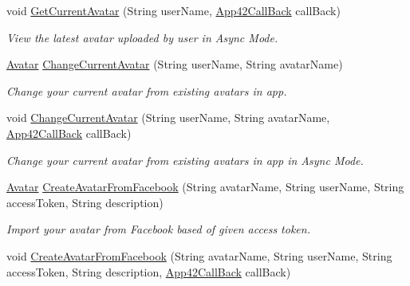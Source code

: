 \begin{DoxyCompactItemize}
void \hyperlink{classcom_1_1shephertz_1_1app42_1_1paas_1_1sdk_1_1csharp_1_1avatar_1_1_avatar_service_a6856f001c444ed300d6c927d7168856b}{Get\+Current\+Avatar} (String user\+Name, \hyperlink{interfacecom_1_1shephertz_1_1app42_1_1paas_1_1sdk_1_1csharp_1_1_app42_call_back}{App42\+Call\+Back} call\+Back)
\begin{DoxyCompactList}\small\item\em View the latest avatar uploaded by user in Async Mode. \end{DoxyCompactList}\item 
\hyperlink{classcom_1_1shephertz_1_1app42_1_1paas_1_1sdk_1_1csharp_1_1avatar_1_1_avatar}{Avatar} \hyperlink{classcom_1_1shephertz_1_1app42_1_1paas_1_1sdk_1_1csharp_1_1avatar_1_1_avatar_service_ae79a7986c8dee949daa72bde1900f4ab}{Change\+Current\+Avatar} (String user\+Name, String avatar\+Name)
\begin{DoxyCompactList}\small\item\em Change your current avatar from existing avatars in app. \end{DoxyCompactList}\item 
void \hyperlink{classcom_1_1shephertz_1_1app42_1_1paas_1_1sdk_1_1csharp_1_1avatar_1_1_avatar_service_ae85cfae1c508eead9a17cc459cd271a9}{Change\+Current\+Avatar} (String user\+Name, String avatar\+Name, \hyperlink{interfacecom_1_1shephertz_1_1app42_1_1paas_1_1sdk_1_1csharp_1_1_app42_call_back}{App42\+Call\+Back} call\+Back)
\begin{DoxyCompactList}\small\item\em Change your current avatar from existing avatars in app in Async Mode. \end{DoxyCompactList}\item 
\hyperlink{classcom_1_1shephertz_1_1app42_1_1paas_1_1sdk_1_1csharp_1_1avatar_1_1_avatar}{Avatar} \hyperlink{classcom_1_1shephertz_1_1app42_1_1paas_1_1sdk_1_1csharp_1_1avatar_1_1_avatar_service_ac03e5b6f2024010a8b6a1dceb283c28c}{Create\+Avatar\+From\+Facebook} (String avatar\+Name, String user\+Name, String access\+Token, String description)
\begin{DoxyCompactList}\small\item\em Import your avatar from Facebook based of given access token. \end{DoxyCompactList}\item 
void \hyperlink{classcom_1_1shephertz_1_1app42_1_1paas_1_1sdk_1_1csharp_1_1avatar_1_1_avatar_service_aa458a6c81f7395dac620a0c7c123ca3d}{Create\+Avatar\+From\+Facebook} (String avatar\+Name, String user\+Name, String access\+Token, String description, \hyperlink{interfacecom_1_1shephertz_1_1app42_1_1paas_1_1sdk_1_1csharp_1_1_app42_call_back}{App42\+Call\+Back} call\+Back)

\end{DoxyCompactItemize}
